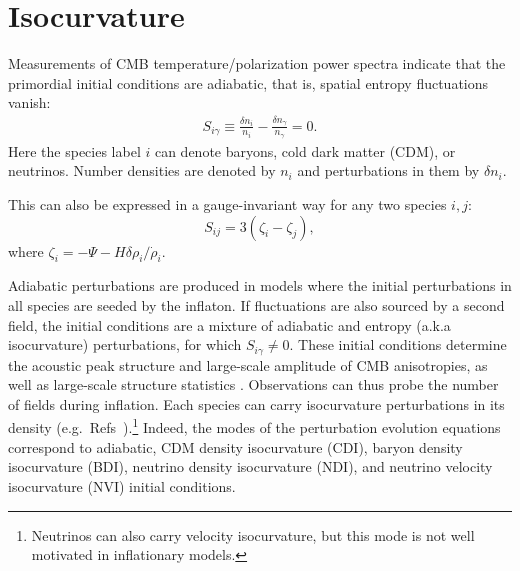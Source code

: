 \section{Isocurvature}
Measurements of CMB temperature/polarization power spectra indicate that the primordial initial conditions are adiabatic, that is, spatial entropy fluctuations vanish:
\begin{align}
S_{i \gamma}\equiv \frac{\delta n_{i}}{n_{i}}-\frac{\delta n_{\gamma}}{n_{\gamma}} =0.
\end{align}
Here the species label $i$ can denote baryons, cold dark matter (CDM), or neutrinos. Number densities are denoted by $n_{i}$ and perturbations in them by $\delta n_{i}$.

This can also be expressed in a gauge-invariant way for any two species $i,j$:
\begin{equation}
S_{ij}=3(\zeta_i-\zeta_j),
\end{equation}
where $\zeta_i = -\Psi - H \delta\rho_i/\dot{\rho}_i$.

Adiabatic perturbations are produced in models where the initial perturbations in all species are seeded by the inflaton. If fluctuations are also sourced by a second field, the initial conditions are a mixture of adiabatic and entropy (a.k.a isocurvature) perturbations, for which $S_{i\gamma}\neq 0$. These initial conditions determine the acoustic peak structure and large-scale amplitude of CMB anisotropies, as well as large-scale structure statistics \cite{Bond:1984fp,Kodama:1986fg,Kodama:1986ud,Hu:1994jd,Moodley:2004nz,Bean:2006qz}. Observations can thus probe the number of fields during inflation. 
\label{sec:isosec}
Each species can carry isocurvature perturbations in its density (e.g.\ Refs~\cite{Bucher:1999re,Bucher:2004an,Moodley:2004nz}).\footnote{Neutrinos can also carry velocity isocurvature, but this mode is not well motivated in inflationary models.} Indeed, the modes of the perturbation evolution equations correspond to adiabatic, CDM density isocurvature (CDI), baryon density isocurvature (BDI), neutrino density isocurvature (NDI), and neutrino velocity isocurvature (NVI) initial conditions. 


